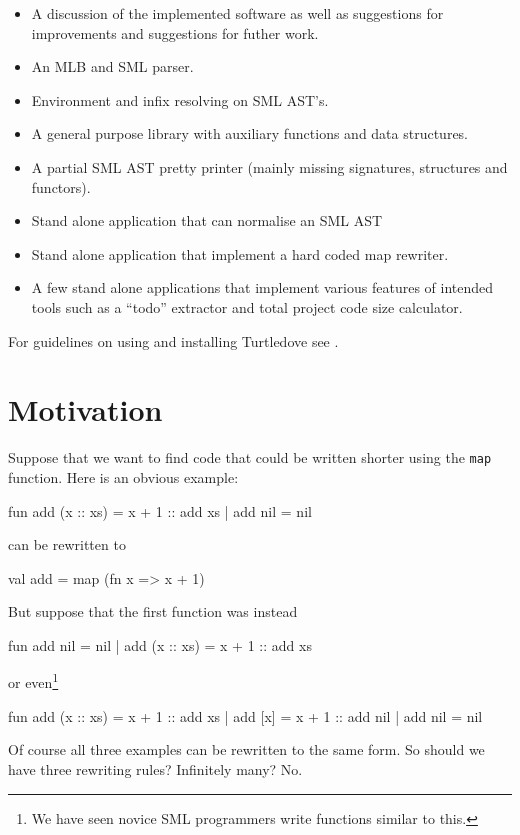 \begin{itemize}

\item A discussion of the implemented software as well as suggestions for
improvements and suggestions for futher work.
\item An MLB and SML parser.
\item Environment and infix resolving on SML AST's.
\item A general purpose library with auxiliary functions and data structures.
\item A partial SML AST pretty printer (mainly missing signatures, structures
  and functors).
\item Stand alone application that can normalise an SML AST
\item Stand alone application that implement a hard coded \textsf{map} rewriter.
\item A few stand alone applications that implement various features of intended
  tools such as a ``todo'' extractor and total project code size calculator.
\end{itemize}

For guidelines on using and installing Turtledove see .

\section{Motivation}
\label{sec:motivation}
Suppose that we want to find code that could be written shorter using the
\texttt{map} function.
Here is an obvious example:
\begin{sml}
fun add (x :: xs) = x + 1 :: add xs
  | add nil       = nil
\end{sml}
can be rewritten to
\begin{sml}
val add = map (fn x => x + 1)
\end{sml}
But suppose that the first function was instead
\begin{sml}
fun add nil       = nil
  | add (x :: xs) = x + 1 :: add xs
\end{sml}
or even\footnote{We have seen novice SML programmers write functions similar to
  this.}
\begin{sml}
fun add (x :: xs) = x + 1 :: add xs
  | add [x]       = x + 1 :: add nil
  | add nil       = nil
\end{sml}
Of course all three examples can be rewritten to the same form. So should we
have three rewriting rules? Infinitely many? No.

